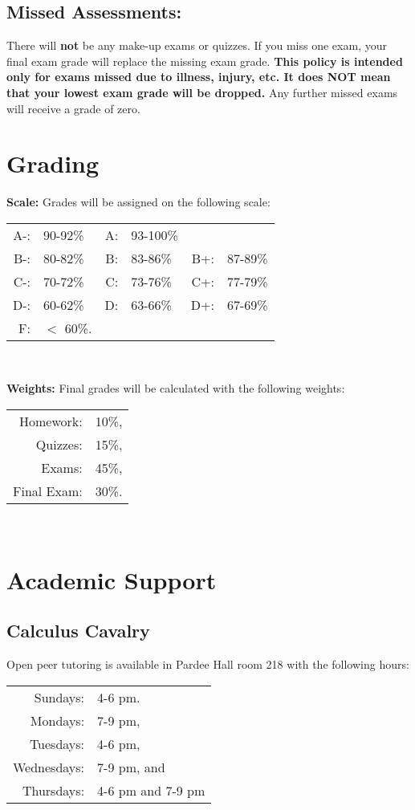 \documentclass[12pt]{amsart}
\begin{document}
\subsection*{Missed Assessments:}
There will {\bf not} be any make-up exams or quizzes.
If you miss one exam, your final exam grade will replace the missing exam grade.
\textbf{This policy is intended only for exams missed due to illness, injury, etc.  
  It does NOT mean that your lowest exam grade will be dropped.}
Any further missed exams will receive a grade of zero.

\section*{Grading}
\noindent\textbf{Scale:}
Grades will be assigned on the following scale:
\begin{center}
  \begin{tabular}{rlrlrl}
    A-: & 90-92\% & A: &93-100\%\\
    B-: & 80-82\% & B: & 83-86\% & B+: &87-89\%\\
    C-: & 70-72\% & C: & 73-76\% & C+: &77-79\%\\
    D-: & 60-62\% & D: & 63-66\% & D+: &67-69\%\\
    F: & $<$ 60\%.\\
  \end{tabular}\\
\end{center}
\textbf{Weights:}
Final grades will be calculated with the following weights:
\begin{center}
  \begin{tabular}{rl}
    Homework: & 10\%,\\
    Quizzes: &15\%,\\
    Exams: & 45\%,\\
    Final Exam: & 30\%.\\
  \end{tabular}\\
\end{center}

\section*{Academic Support}
\subsection*{Calculus Cavalry}
\noindent
Open peer tutoring is available in Pardee Hall room 218 with the following hours:
\begin{center}
  \begin{tabular}{rl}
    Sundays: &4-6 pm.\\
    Mondays: &7-9 pm,\\
    Tuesdays: &4-6 pm,\\
    Wednesdays: &7-9 pm, and\\
    Thursdays: &4-6 pm and 7-9 pm
  \end{tabular}
\end{center}
\end{document}
